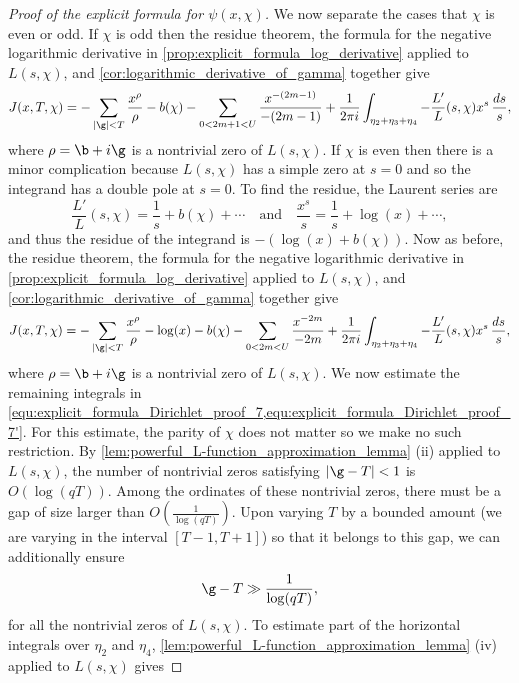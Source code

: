 \begin{proof}[Proof of the explicit formula for \(\psi(x,\chi)\)]
      We now separate the cases that \(\chi\) is even or odd. If \(\chi\) is odd then the residue theorem, the formula for the negative logarithmic derivative in \cref{prop:explicit_formula_log_derivative} applied to \(L(s,\chi)\), and \cref{cor:logarithmic_derivative_of_gamma} together give
      \begin{equation}\label{equ:explicit_formula_Dirichlet_proof_7}
        J(x,T,\chi) = -\sum_{|\g| < T}\frac{x^{\rho}}{\rho}-b(\chi)-\sum_{0 < 2m+1 < U}\frac{x^{-(2m-1)}}{-(2m-1)}+\frac{1}{2\pi i}\int_{\eta_{2}+\eta_{3}+\eta_{4}}-\frac{L'}{L}(s,\chi)x^{s}\,\frac{ds}{s},
      \end{equation}
      where \(\rho = \b+i\g\) is a nontrivial zero of \(L(s,\chi)\). If \(\chi\) is even then there is a minor complication because \(L(s,\chi)\) has a simple zero at \(s = 0\) and so the integrand has a double pole at \(s = 0\). To find the residue, the Laurent series are
      \[
        \frac{L'}{L}(s,\chi) = \frac{1}{s}+b(\chi)+\cdots \quad \text{and} \quad \frac{x^{s}}{s} = \frac{1}{s}+\log(x)+\cdots,
      \]
      and thus the residue of the integrand is \(-(\log(x)+b(\chi))\). Now as before, the residue theorem, the formula for the negative logarithmic derivative in \cref{prop:explicit_formula_log_derivative} applied to \(L(s,\chi)\), and \cref{cor:logarithmic_derivative_of_gamma} together give
      \begin{equation}\label{equ:explicit_formula_Dirichlet_proof_7'}
        J(x,T,\chi) = -\sum_{|\g| < T}\frac{x^{\rho}}{\rho}-\log(x)-b(\chi)-\sum_{0 < 2m < U}\frac{x^{-2m}}{-2m}+\frac{1}{2\pi i}\int_{\eta_{2}+\eta_{3}+\eta_{4}}-\frac{L'}{L}(s,\chi)x^{s}\,\frac{ds}{s},
      \end{equation}
      where \(\rho = \b+i\g\) is a nontrivial zero of \(L(s,\chi)\). We now estimate the remaining integrals in \cref{equ:explicit_formula_Dirichlet_proof_7,equ:explicit_formula_Dirichlet_proof_7'}. For this estimate, the parity of \(\chi\) does not matter so we make no such restriction. By \cref{lem:powerful_L-function_approximation_lemma} (ii) applied to \(L(s,\chi)\), the number of nontrivial zeros satisfying \(|\g-T| < 1\) is \(O(\log(qT))\). Among the ordinates of these nontrivial zeros, there must be a gap of size larger than \(O\left(\frac{1}{\log(qT)}\right)\). Upon varying \(T\) by a bounded amount (we are varying in the interval \([T-1,T+1]\)) so that it belongs to this gap, we can additionally ensure
      \[
        \g-T \gg \frac{1}{\log(qT)},
      \]
      for all the nontrivial zeros of \(L(s,\chi)\). To estimate part of the horizontal integrals over \(\eta_{2}\) and \(\eta_{4}\), \cref{lem:powerful_L-function_approximation_lemma} (iv) applied to \(L(s,\chi)\) gives

\end{proof}
